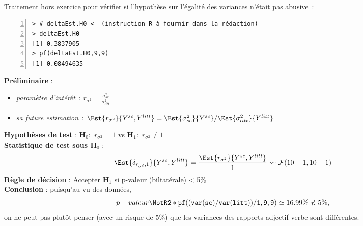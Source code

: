 \documentclass[10pt]{report}
\begin{document}
\begin{exercice}
Traitement hors exercice pour v{\'e}rifier si l'hypoth{\`e}se sur l'{\'e}galit{\'e} des variances  n'{\'e}tait pas abusive~:

\IndicR
\begin{Verbatim}[frame=leftline,fontfamily=tt,fontshape=n,numbers=left]
> # deltaEst.H0 <- (instruction R à fournir dans la rédaction)
> deltaEst.H0
[1] 0.3837905
> pf(deltaEst.H0,9,9)
[1] 0.08494635
\end{Verbatim}

 

\begin{Correction}
\noindent \textbf{Préliminaire} : \begin{itemize}
\item \textit{paramètre d'intérêt}~: $r_{\sigma^2}=\displaystyle \frac{\sigma^2_{sc}}{\sigma^2_{litt}}$
\item \textit{sa future estimation}~: $\Est{r_{\sigma^2}}{Y^{sc},Y^{litt}}=\Est{\sigma^2_{sc}}{Y^{sc}}/\Est{\sigma^2_{litt}}{Y^{litt}}$
\end{itemize}
\noindent \textbf{Hypothèses de test} : $\mathbf{H}_0:$ $r_{\sigma^2}=1$ vs {\large $\mathbf{H}_1:$ $r_{\sigma^2}\neq1$}\\
\textbf{Statistique de test sous $\mathbf{H}_0$} :
  $$
  \Est{\delta_{r_{\sigma^2},1}}{Y^{sc},Y^{litt}}= {\displaystyle \frac{\Est{r_{\sigma^2}}{Y^{sc},Y^{litt}}}{1}} 
  \leadsto \mathcal{F}(10-1,10-1) 
  $$
\textbf{Règle de décision} : Accepter $\mathbf{H}_1$ si 
  p-valeur (biltatérale) < 5\%\\
\noindent \textbf{Conclusion} :
puisqu'au vu des données, 
  \[
p-valeur\NotR\mathtt{2*pf((var(sc)/var(litt))/1,9,9)} \simeq 16.99\%\nless5\%,
\]
on ne peut pas plutôt penser (avec un risque de 5\%) que les variances des rapports adjectif-verbe sont différentes.
\end{Correction}


\end{exercice}
\end{document}

